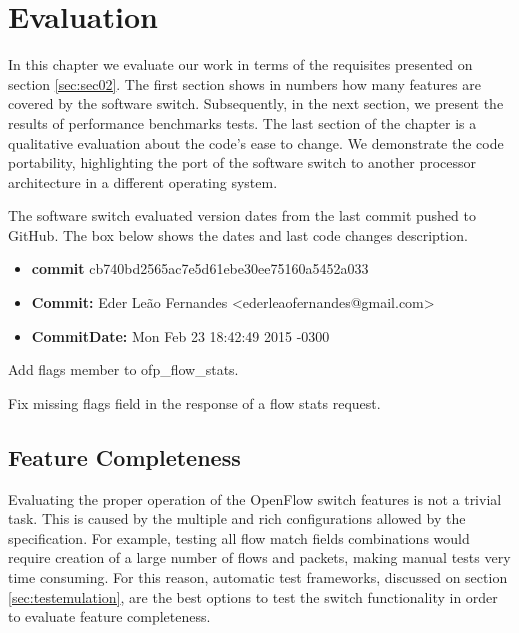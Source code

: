 \chapter{Evaluation}
\label{cap:cap05}

In this chapter we evaluate our work in terms of the requisites presented on section \ref{sec:sec02}. The first section shows in numbers how many features are covered by the software switch. Subsequently, in the next section, we present the results of performance benchmarks tests. The last section of the chapter is a qualitative evaluation about the code's ease to change. We demonstrate the code portability, highlighting the port of the software switch to another processor architecture in a different operating system.      

The software switch evaluated version dates from the last commit pushed to GitHub. The box below shows the dates and last code changes description.

\begin{framed}

\begin{itemize}
\item \textbf{commit} cb740bd2565ac7e5d61ebe30ee75160a5452a033
\item   \textbf{Commit:}     Eder Leão Fernandes <ederleaofernandes@gmail.com> 
\item \textbf{CommitDate:} Mon Feb 23 18:42:49 2015 -0300 
\end{itemize}
     
    Add flags member to ofp_flow_stats.
    
    Fix missing flags field in the response of a flow stats request.
\end{framed}

\section{Feature Completeness}
\label{sec:FeatureComplete}
Evaluating the proper operation of the OpenFlow switch features is not a trivial task. This is caused by the multiple and rich configurations allowed by the specification. For example, testing all flow match fields combinations would require creation of a large number of flows and packets, making manual tests very time consuming. For this reason, automatic test frameworks, discussed on section \ref{sec:testemulation}, are the best options to test the switch functionality in order to evaluate feature completeness.    

